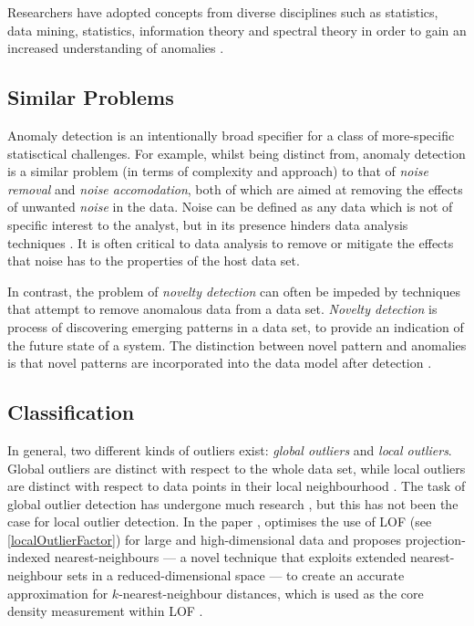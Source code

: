 Researchers have adopted concepts from diverse disciplines such as statistics,
data mining, statistics, information theory and spectral theory in order to gain
an increased understanding of anomalies \cite{Chandola:2007}.

\subsection{Similar Problems}
\label{anomalyDetection:similarProblems}
Anomaly detection is an intentionally broad specifier for a class of
more-specific statisctical challenges. For example, whilst being distinct from,
anomaly detection is a similar problem (in terms of complexity and approach) to
that of \emph{noise removal} and \emph{noise accomodation}, both of which are
aimed at removing the effects of unwanted \emph{noise} in the data. Noise can be
defined as any data which is not of specific interest to the analyst, but in its
presence hinders data analysis techniques \cite{Chandola:2007}. It is often
critical to data analysis to remove or mitigate the effects that noise has to
the properties of the host data set.

In contrast, the problem of \emph{novelty detection} can often be impeded by
techniques that attempt to remove anomalous data from a data set. \emph{Novelty
detection} is process of discovering emerging patterns in a data set, to provide
an indication of the future state of a system. The distinction between novel
pattern and anomalies is that novel patterns are incorporated into the data
model after detection \cite{Chandola:2007}.

\subsection{Classification}
\label{anomalyDetection:classification}
In general, two different kinds of outliers exist: \emph{global outliers} and 
\emph{local outliers}. Global outliers are distinct with respect to the whole
data set, while local outliers are distinct with respect to data points in their
local neighbourhood \cite{Vries:2011}. The task of global outlier detection has
undergone much research \citeNeeded, but this has not been the case for local
outlier detection. In the paper , \citeauthor{Vries:2011}
optimises the use of \gls{LOF} (see \autoref{localOutlierFactor}) for large and
high-dimensional data and proposes projection-indexed nearest-neighbours --- a
novel technique that exploits extended nearest-neighbour sets in a
reduced-dimensional space --- to create an accurate approximation for
$k$-nearest-neighbour distances, which is used as the core density measurement
within \gls{LOF} \cite{Vries:2011}.

